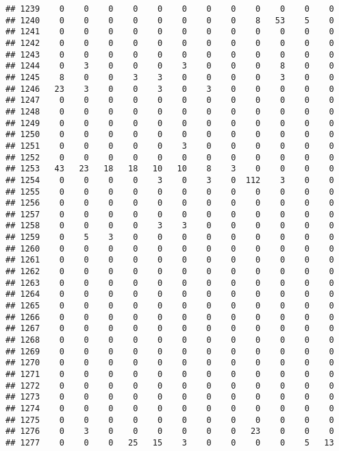 \documentclass[]{article}
\begin{document}
\begin{verbatim}
## 1239    0    0    0    0    0    0    0    0    0    0    0    0
## 1240    0    0    0    0    0    0    0    0    8   53    5    0
## 1241    0    0    0    0    0    0    0    0    0    0    0    0
## 1242    0    0    0    0    0    0    0    0    0    0    0    0
## 1243    0    0    0    0    0    0    0    0    0    0    0    0
## 1244    0    3    0    0    0    3    0    0    0    8    0    0
## 1245    8    0    0    3    3    0    0    0    0    3    0    0
## 1246   23    3    0    0    3    0    3    0    0    0    0    0
## 1247    0    0    0    0    0    0    0    0    0    0    0    0
## 1248    0    0    0    0    0    0    0    0    0    0    0    0
## 1249    0    0    0    0    0    0    0    0    0    0    0    0
## 1250    0    0    0    0    0    0    0    0    0    0    0    0
## 1251    0    0    0    0    0    3    0    0    0    0    0    0
## 1252    0    0    0    0    0    0    0    0    0    0    0    0
## 1253   43   23   18   18   10   10    8    3    0    0    0    0
## 1254    0    0    0    0    3    0    3    0  112    3    0    0
## 1255    0    0    0    0    0    0    0    0    0    0    0    0
## 1256    0    0    0    0    0    0    0    0    0    0    0    0
## 1257    0    0    0    0    0    0    0    0    0    0    0    0
## 1258    0    0    0    0    3    3    0    0    0    0    0    0
## 1259    0    5    3    0    0    0    0    0    0    0    0    0
## 1260    0    0    0    0    0    0    0    0    0    0    0    0
## 1261    0    0    0    0    0    0    0    0    0    0    0    0
## 1262    0    0    0    0    0    0    0    0    0    0    0    0
## 1263    0    0    0    0    0    0    0    0    0    0    0    0
## 1264    0    0    0    0    0    0    0    0    0    0    0    0
## 1265    0    0    0    0    0    0    0    0    0    0    0    0
## 1266    0    0    0    0    0    0    0    0    0    0    0    0
## 1267    0    0    0    0    0    0    0    0    0    0    0    0
## 1268    0    0    0    0    0    0    0    0    0    0    0    0
## 1269    0    0    0    0    0    0    0    0    0    0    0    0
## 1270    0    0    0    0    0    0    0    0    0    0    0    0
## 1271    0    0    0    0    0    0    0    0    0    0    0    0
## 1272    0    0    0    0    0    0    0    0    0    0    0    0
## 1273    0    0    0    0    0    0    0    0    0    0    0    0
## 1274    0    0    0    0    0    0    0    0    0    0    0    0
## 1275    0    0    0    0    0    0    0    0    0    0    0    0
## 1276    0    3    0    0    0    0    0    0   23    0    0    0
## 1277    0    0    0   25   15    3    0    0    0    0    5   13

\end{verbatim}
\end{document}
